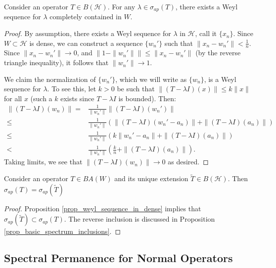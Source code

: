 \documentclass[12pt]{article}
\begin{document}
\begin{proposition}
\label{prop_weyl_sequence_in_dense}
	Consider an operator $T\in B(\mathcal{H})$. For any $\lambda\in\sigma_{ap}(T)$, there exists a Weyl sequence for $\lambda$ completely contained in $W$.
\end{proposition}
\begin{proof}
	By assumption, there exists a Weyl sequence for $\lambda$ in $\mathcal{H}$, call it $\{x_n\}$. Since $W\subset\mathcal{H}$ is dense, we can construct a sequence $\{w_n'\}$ such that $\|x_n-w_n'\|<\frac{1}{n}$. Since $\|x_n-w_n'\|\to 0$, and $\|1-\|w_n'\|\|\leq\|x_n-w_n'\|$ (by the reverse triangle inequality), it follows that $\|w_n'\|\to 1$.

	We claim the normalization of $\{w_n'\}$, which we will write as $\{w_n\}$, is a Weyl sequence for $\lambda$. To see this, let $k>0$ be such that $\|(T-\lambda I)(x)\|\leq k\|x\|$ for all $x$ (such a $k$ exists since $T-\lambda I$ is bounded). Then:
	\begin{align*}
		\|(T-\lambda I)(w_n)\| =& \frac{1}{\|w_n'\|}\|(T-\lambda I)(w_n')\| \\
		\leq& \frac{1}{\|w_n'\|}(\|(T-\lambda I)(w_n' - a_n)\| + \|(T-\lambda I)(a_n)\|) \\
		\leq&  \frac{1}{\|w_n'\|}(k\|w_n'-a_n\| + \|(T-\lambda I)(a_n)\|) \\
		<& \frac{1}{\|w_n'\|}\left(\frac{k}{n}+\|(T-\lambda I)(a_n)\|\right).	
	\end{align*}
	Taking limits, we see that $\|(T-\lambda I)(w_n)\| \to 0$ as desired.
\end{proof}

\begin{corollary}
\label{cor_approximate_same}
	Consider an operator $T\in BA(W)$ and its unique extension $\tilde{T}\in B(\mathcal{H})$. Then $\sigma_{ap}(T)=\sigma_{ap}(\tilde{T})$
\end{corollary}
\begin{proof}
	Proposition \ref{prop_weyl_sequence_in_dense} implies that $\sigma_{ap}(\tilde{T})\subset\sigma_{ap}(T)$. The reverse inclusion is discussed in Proposition \ref{prop_basic_spectrum_inclusions}.
\end{proof}


\subsection{Spectral Permanence for Normal Operators} %
\end{document}

